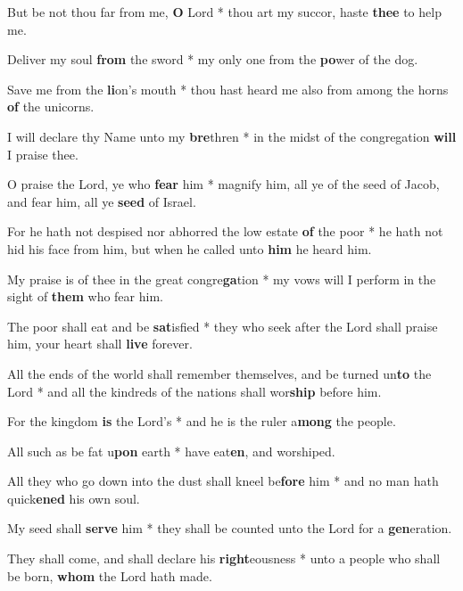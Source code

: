 \begin{multicols}{2}
	But be not thou far from me, \textbf{O} Lord * thou art my succor, haste \textbf{thee} to help me.
	
	Deliver my soul \textbf{from} the sword * my only one from the \textbf{po}wer of the dog.
	
	Save me from the \textbf{li}on's mouth * thou hast heard me also from among the horns \textbf{of} the unicorns.
	
	I will declare thy Name unto my \textbf{bre}thren * in the midst of the congregation \textbf{will} I praise thee.
	
	O praise the Lord, ye who \textbf{fear} him * magnify him, all ye of the seed of Jacob, and fear him, all ye \textbf{seed} of Israel.
	
	For he hath not despised nor abhorred the low estate \textbf{of} the poor * he hath not hid his face from him, but when he called unto \textbf{him} he heard him.
	
	My praise is of thee in the great congre\textbf{ga}tion * my vows will I perform in the sight of \textbf{them} who fear him.
	
	The poor shall eat and be \textbf{sat}isfied * they who seek after the Lord shall praise him, your heart shall \textbf{live} forever.
	
	All the ends of the world shall remember themselves, and be turned un\textbf{to} the Lord * and all the kindreds of the nations shall wor\textbf{ship} before him.
	
	For the kingdom \textbf{is} the Lord's * and he is the ruler a\textbf{mong} the people.
	
	All such as be fat u\textbf{pon} earth * have eat\textbf{en}, and worshiped.
	
	All they who go down into the dust shall kneel be\textbf{fore} him * and no man hath quick\textbf{ened} his own soul.
	
	My seed shall \textbf{serve} him * they shall be counted unto the Lord for a \textbf{gen}eration.
	
	They shall come, and shall declare his \textbf{right}eousness * unto a people who shall be born, \textbf{whom} the Lord hath made.
\end{multicols}